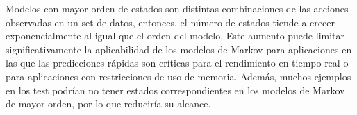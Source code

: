 Modelos con mayor orden de estados son distintas combinaciones de las acciones observadas en un set de datos, entonces, el número de estados tiende a crecer exponencialmente al igual que el orden del modelo. 
Este aumento puede limitar significativamente la aplicabilidad de los modelos de Markov para aplicaciones en las que las predicciones rápidas son críticas para el rendimiento en tiempo real o para aplicaciones con restricciones de uso de memoria. Además, muchos ejemplos en los test podrían no tener estados correspondientes en los modelos de Markov de mayor orden, por lo que reduciría su alcance.


